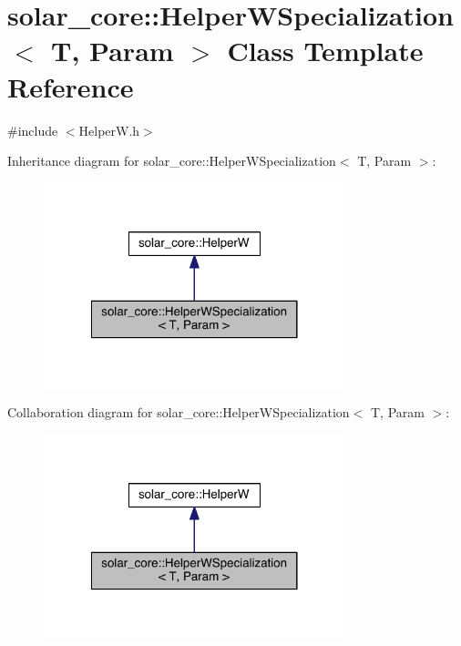 \hypertarget{classsolar__core_1_1_helper_w_specialization}{}\section{solar\+\_\+core\+:\+:Helper\+W\+Specialization$<$ T, Param $>$ Class Template Reference}
\label{classsolar__core_1_1_helper_w_specialization}


{\ttfamily \#include $<$Helper\+W.\+h$>$}



Inheritance diagram for solar\+\_\+core\+:\+:Helper\+W\+Specialization$<$ T, Param $>$\+:
\nopagebreak
\begin{figure}[H]
\begin{center}
\leavevmode
\includegraphics[width=248pt]{classsolar__core_1_1_helper_w_specialization__inherit__graph}
\end{center}
\end{figure}


Collaboration diagram for solar\+\_\+core\+:\+:Helper\+W\+Specialization$<$ T, Param $>$\+:
\nopagebreak
\begin{figure}[H]
\begin{center}
\leavevmode
\includegraphics[width=248pt]{classsolar__core_1_1_helper_w_specialization__coll__graph}
\end{center}
\end{figure}
